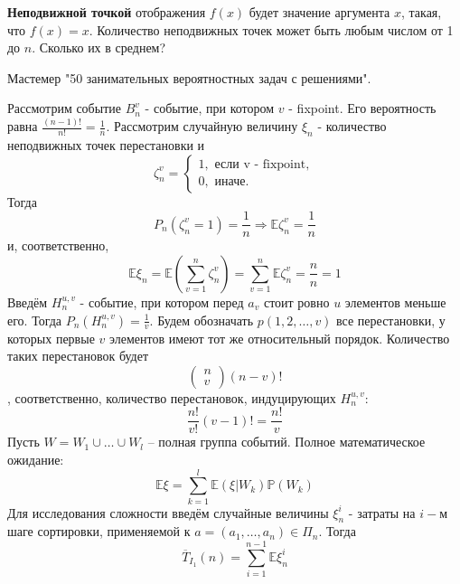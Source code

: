 \documentclass[11pt]{article}
\newcounter{th}\setcounter{th}{0}
\begin{document}
\textbf{Неподвижной точкой} отображения \(f(x)\) будет значение аргумента \(x\), такая, что \(f(x) = x\).
Количество неподвижных точек может быть любым числом от 1 до \(n\). Сколько их в среднем?

Мастемер "50 занимательных вероятностных задач с решениями".

Рассмотрим событие \(B_n^v\) - событие, при котором \(v\) - fixpoint. Его вероятность равна
\(\frac{(n - 1)!}{n!} = \frac1n\). Рассмотрим случайную величину \(\xi_n\) - количество
неподвижных точек перестановки и
\begin{equation}
\zeta_n^v = \begin{cases}
1, \text{ если v - fixpoint}, \\
0, \text{ иначе.}
\end{cases}
\end{equation}
Тогда
\begin{equation}
P_n(\zeta_n^v = 1) = \frac1n \Rightarrow \mathbb{E}\zeta_n^v = \frac1n
\end{equation}
и, соответственно,
\begin{equation}
\mathbb{E}\xi_n = \mathbb{E}\left(\sum_{v = 1}^n\zeta_n^v\right) =
\sum_{v = 1}^n\mathbb{E}\zeta_n^v = \frac{n}n = 1
\end{equation}
Введём \(H_n^{u, v}\) - событие, при котором перед \(a_v\) стоит ровно \(u\) элементов меньше его.
Тогда \(P_n(H_n^{u, v}) = \frac1v\). Будем обозначать \(p(1, 2, \ldots, v)\) все перестановки, у
которых первые \(v\) элементов имеют тот же относительный порядок. Количество таких перестановок
будет
\begin{equation}
\begin{pmatrix}
n \\
v
\end{pmatrix}(n - v)!
\end{equation},
соответственно, количество перестановок, индуцирующих $H_n^{u, v}$:
\begin{equation}
\frac{n!}{v!}(v - 1)! = \frac{n!}v
\end{equation}
Пусть \(W = W_1 \cup \ldots \cup W_l\) -- полная группа событий. Полное математическое ожидание:
\begin{equation}
\mathbb{E}\xi = \sum_{k = 1}^l\mathbb{E}(\xi | W_k)\mathbb{P}(W_k)
\end{equation}
Для исследования сложности введём случайные величины \(\xi_n^i\) - затраты на \(i-м\) шаге сортировки,
применяемой к \(a = (a_1, \ldots, a_n) \in \Pi_n\). Тогда
\begin{equation}
\overline{T}_{I_1}(n) = \sum_{i = 1}^{n - 1}\mathbb{E}\xi_n^i
\end{equation}
\end{document}
